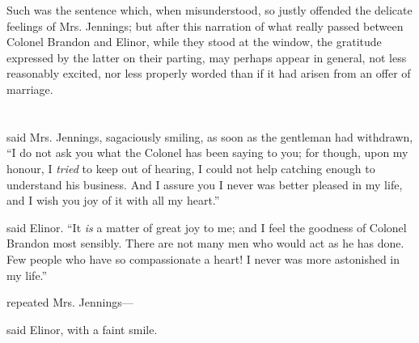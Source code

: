 Such was the sentence which, when misunderstood, so justly offended the delicate feelings of Mrs. Jennings; but after this narration of what really passed between Colonel Brandon and Elinor, while they stood at the window, the gratitude expressed by the latter on their parting, may perhaps appear in general, not less reasonably excited, nor less properly worded than if it had arisen from an offer of marriage.

\chapter{} %

 said Mrs. Jennings, sagaciously smiling, as soon as the gentleman had withdrawn, “I do not ask you what the Colonel has been saying to you; for though, upon my honour, I {\em tried} to keep out of hearing, I could not help catching enough to understand his business. And I assure you I never was better pleased in my life, and I wish you joy of it with all my heart.”

 said Elinor. “It {\em is} a matter of great joy to me; and I feel the goodness of Colonel Brandon most sensibly. There are not many men who would act as he has done. Few people who have so compassionate a heart! I never was more astonished in my life.”



 repeated Mrs. Jennings---

 said Elinor, with a faint smile.



